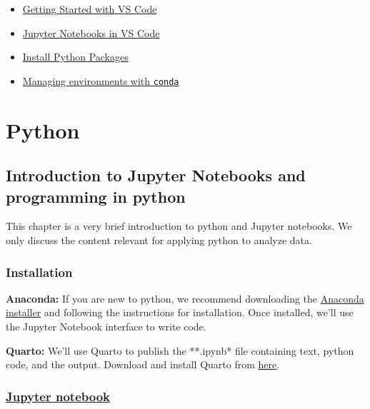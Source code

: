 \documentclass[
  letterpaper,
  DIV=11,
  numbers=noendperiod]{scrreprt}
\providecommand{\tightlist}{%
  \setlength{\itemsep}{0pt}\setlength{\parskip}{0pt}}\usepackage{longtable,booktabs,array}
\begin{document}
\begin{itemize}
\tightlist
\item
  \href{https://code.visualstudio.com/docs/getstarted/userinterface}{Getting
  Started with VS Code}
\item
  \href{https://code.visualstudio.com/docs/datascience/jupyter-notebooks}{Jupyter
  Notebooks in VS Code}
\item
  \href{https://packaging.python.org/en/latest/tutorials/installing-packages/}{Install
  Python Packages}
\item
  \href{https://docs.conda.io/projects/conda/en/latest/user-guide/tasks/manage-environments.html}{Managing
  environments with \texttt{conda}}
\end{itemize}

\part{Python}

\hypertarget{introduction-to-jupyter-notebooks-and-programming-in-python}{%
\chapter{Introduction to Jupyter Notebooks and programming in
python}\label{introduction-to-jupyter-notebooks-and-programming-in-python}}

This chapter is a very brief introduction to python and Jupyter
notebooks. We only discuss the content relevant for applying python to
analyze data.

\hypertarget{installation}{%
\section{Installation}\label{installation}}

\textbf{Anaconda:} If you are new to python, we recommend downloading
the \href{https://docs.anaconda.com/anaconda/install/}{Anaconda
installer} and following the instructions for installation. Once
installed, we'll use the Jupyter Notebook interface to write code.

\textbf{Quarto:} We'll use Quarto to publish the **.ipynb* file
containing text, python code, and the output. Download and install
Quarto from \href{https://quarto.org/docs/get-started/}{here}.

\hypertarget{jupyter-notebook}{%
\section{\texorpdfstring{\href{https://jupyter-notebook.readthedocs.io/en/stable/notebook.html}{Jupyter
notebook}}{Jupyter notebook}}\label{jupyter-notebook}}
\end{document}
